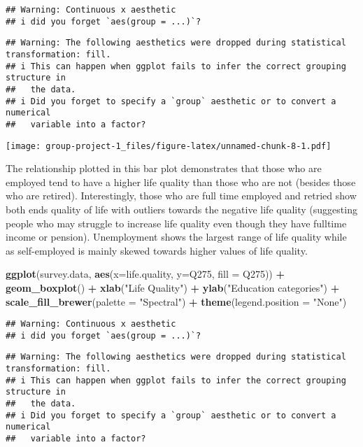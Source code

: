 \documentclass[
]{article}
\newenvironment{Shaded}{\begin{snugshade}}{\end{snugshade}}
\newcommand{\AttributeTok}[1]{\textcolor[rgb]{0.13,0.29,0.53}{#1}}
\newcommand{\FunctionTok}[1]{\textcolor[rgb]{0.13,0.29,0.53}{\textbf{#1}}}
\newcommand{\NormalTok}[1]{#1}
\newcommand{\SpecialCharTok}[1]{\textcolor[rgb]{0.81,0.36,0.00}{\textbf{#1}}}
\newcommand{\StringTok}[1]{\textcolor[rgb]{0.31,0.60,0.02}{#1}}
\begin{document}
\begin{verbatim}
## Warning: Continuous x aesthetic
## i did you forget `aes(group = ...)`?
\end{verbatim}

\begin{verbatim}
## Warning: The following aesthetics were dropped during statistical transformation: fill.
## i This can happen when ggplot fails to infer the correct grouping structure in
##   the data.
## i Did you forget to specify a `group` aesthetic or to convert a numerical
##   variable into a factor?
\end{verbatim}

\texttt{[image: group-project-1\_files/figure-latex/unnamed-chunk-8-1.pdf]}

The relationship plotted in this bar plot demonstrates that those who
are employed tend to have a higher life quality than those who are not
(besides those who are retired). Interestingly, those who are full time
employed and retried show both ends quality of life with outliers
towards the negative life quality (suggesting people who may struggle to
increase life quality even though they have fulltime income or pension).
Unemployment shows the largest range of life quality while as
self-employed is mainly skewed towards higher values of life quality.

\begin{Shaded}
\begin{Highlighting}[]
\FunctionTok{ggplot}\NormalTok{(survey.data, }\FunctionTok{aes}\NormalTok{(}\AttributeTok{x=}\NormalTok{life.quality, }\AttributeTok{y=}\NormalTok{Q275, }\AttributeTok{fill =}\NormalTok{ Q275)) }\SpecialCharTok{+} 
  \FunctionTok{geom\_boxplot}\NormalTok{() }\SpecialCharTok{+}
  \FunctionTok{xlab}\NormalTok{(}\StringTok{"Life Quality"}\NormalTok{) }\SpecialCharTok{+}
  \FunctionTok{ylab}\NormalTok{(}\StringTok{"Education categories"}\NormalTok{) }\SpecialCharTok{+}
  \FunctionTok{scale\_fill\_brewer}\NormalTok{(}\AttributeTok{palette =} \StringTok{"Spectral"}\NormalTok{) }\SpecialCharTok{+}
  \FunctionTok{theme}\NormalTok{(}\AttributeTok{legend.position =} \StringTok{"None"}\NormalTok{)}
\end{Highlighting}
\end{Shaded}

\begin{verbatim}
## Warning: Continuous x aesthetic
## i did you forget `aes(group = ...)`?
\end{verbatim}

\begin{verbatim}
## Warning: The following aesthetics were dropped during statistical transformation: fill.
## i This can happen when ggplot fails to infer the correct grouping structure in
##   the data.
## i Did you forget to specify a `group` aesthetic or to convert a numerical
##   variable into a factor?
\end{verbatim}
\end{document}

